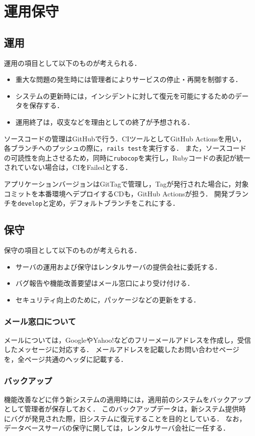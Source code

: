 \chapter{運用保守}
\section{運用}
運用の項目として以下のものが考えられる．
\begin{itemize}
    \item 重大な問題の発生時には管理者によりサービスの停止・再開を制御する．
    \item システムの更新時には，インシデントに対して復元を可能にするためのデータを保存する．
    \item 運用終了は，収支などを理由としての終了が予想される．
\end{itemize}
ソースコードの管理はGitHubで行う．CIツールとしてGitHub Actionsを用い，各ブランチへのプッシュの際に，\texttt{rails test}を実行する．
また，ソースコードの可読性を向上させるため，同時に\texttt{rubocop}を実行し，Rubyコードの表記が統一されていない場合は，CIをFailedとする．\par
アプリケーションバージョンはGitTagで管理し，Tagが発行された場合に，対象コミットを本番環境へデプロイするCDも，GitHub Actionsが担う．
開発ブランチを\texttt{develop}と定め，デフォルトブランチをこれにする．
\section{保守}
保守の項目として以下のものが考えられる．
\begin{itemize}
    \item サーバの運用および保守はレンタルサーバの提供会社に委託する．
    \item バグ報告や機能改善要望はメール窓口により受け付ける．
    \item セキュリティ向上のために，パッケージなどの更新をする．
\end{itemize}
\subsection*{メール窓口について}
メールについては，GoogleやYahoo!などのフリーメールアドレスを作成し，受信したメッセージに対応する．
メールアドレスを記載したお問い合わせページを，全ページ共通のヘッダに記載する．
\subsection*{バックアップ}
機能改善などに伴う新システムの適用時には，適用前のシステムをバックアップとして管理者が保存しておく．
このバックアップデータは，新システム提供時にバグが発見された際，旧システムに復元することを目的としている．
なお，データベースサーバの保守に関しては，レンタルサーバ会社に一任する．
